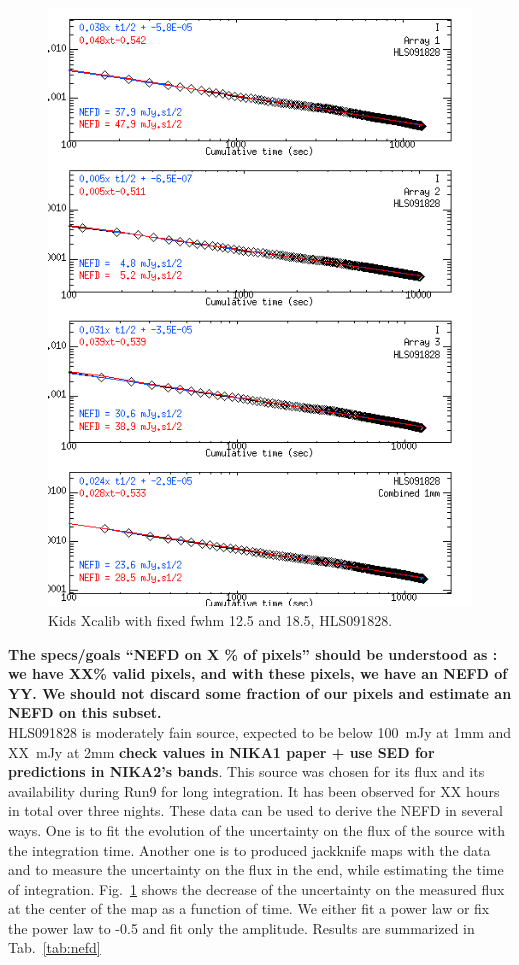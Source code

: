 \documentclass[a4paper, 11pt]{article} %
\begin{document}
\begin{figure}
\begin{center}
\includegraphics[clip, angle=0, scale = 0.5]{Figures/NEFD_HLS091828_20170226s415_FXDC0C1_GaussPhot.png}
\caption{Kids Xcalib with fixed fwhm 12.5 and 18.5, HLS091828.}
\label{fig:nefd_vs_t}
\end{center}
\end{figure}

{\bf The specs/goals ``NEFD on X \% of pixels'' should be understood as : we have
XX\% valid pixels, and with these pixels, we have an NEFD of YY. We should not
discard some fraction of our pixels and estimate an NEFD on this subset.}\\

HLS091828 is moderately fain source, expected to be below 100~mJy at 1mm and
XX~mJy at 2mm {\bf check values in NIKA1 paper + use SED for predictions in
  NIKA2's bands}. This source was chosen for its flux and its availability during
Run9 for long integration. It has been observed for XX hours in total over three
nights. These data can be used to derive the NEFD in several ways. One is to fit
the evolution of the uncertainty on the flux of the source with the integration
time. Another one is to produced jackknife maps with the data and to measure the
uncertainty on the flux in the end, while estimating the time of
integration. Fig.~\ref{fig:nefd_vs_t} shows the decrease of the uncertainty on
the measured flux at the center of the map as a function of time. We either fit
a power law or fix the power law to -0.5 and fit only the amplitude. Results are
summarized in Tab.~\ref{tab:nefd}
\end{document}
